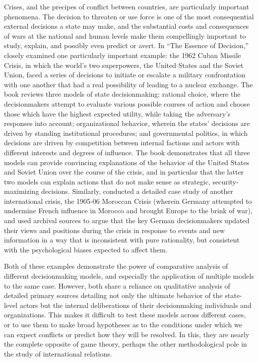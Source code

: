 Crises, and the precipes of conflict between countries, are particularly important phenomena. The decision to threaten or use force is one of the most consequential external decisions a state may make, and the substantial costs and consequences of wars at the national and human levels make them compellingly important to study, explain, and possibly even predict or avert. In ``The Essence of Decision,'' \citet{allison_1999} closely examined one particularly important example: the 1962 Cuban Missile Crisis, in which the world's two superpowers, the United States and the Soviet Union, faced a series of decisions to initiate or escalate a military confrontation with one another that had a real possibility of leading to a nuclear exchange. The book reviews three models of state decisionmaking: rational choice, where the decisionmakers attempt to evaluate various possible courses of action and choose those which have the highest expected utility, while taking the adversary's responses into account; organizational behavior, wherein the states' decisions are driven by standing institutional procedures; and governmental politics, in which decisions are driven by competition between internal factions and actors with different interests and degrees of influence. The book demonstrates that all three models can provide convincing explanations of the behavior of the United States and Soviet Union over the course of the crisis, and in particular that the latter two models can explain actions that do not make sense as strategic, security-maximizing decisions. Similarly, \citet{kaufmann_1994} conducted a detailed case study of another international crisis, the 1905-06 Moroccan Crisis (wherein Germany attempted to undermine French influence in Morocco and brought Europe to the brink of war), and used archival sources to argue that the key German decisionmakers updated their views and positions during the crisis in response to events and new information in a way that is inconsistent with pure rationality, but consistent with the psychological biases expected to affect them.

Both of these examples demonstrate the power of comparative analysis of different decisionmaking models, and especially the application of multiple models to the same case. However, both share a reliance on qualitative analysis of detailed primary sources detailing not only the ultimate behavior of the state-level actors but the internal deliberations of their decisionmaking individuals and organizations. This makes it difficult to test these models across different cases, or to use them to make broad hypotheses as to the conditions under which we can expect conflicts or predict how they will be resolved. In this, they are nearly the complete opposite of game theory, perhaps the other methodological pole in the study of international relations. 

